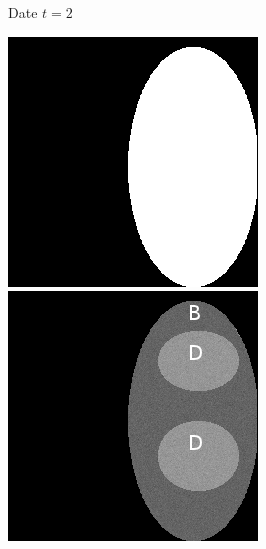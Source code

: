 \begin{frame}
\begin{columns}[c]
\begin{exampleblock}{Date $t=2$}
\begin{center}
						\includegraphics[trim= 0mm 0mm 0mm 0mm, clip, height=0.7\textwidth]{image/me_1_3_img_7.png}	\\
						\includegraphics[trim= 0mm 0mm 0mm 0mm, clip, height=0.7\textwidth]{image/me_1_3_img_2.png}						
					\end{center}
				\end{exampleblock}

		\end{columns}
		
	\end{frame}	
	

